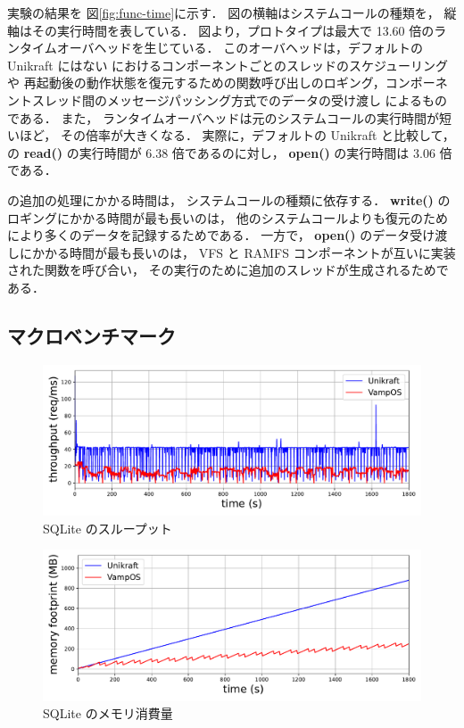 実験の結果を
図\ref{fig:func-time}に示す．
図の横軸はシステムコールの種類を，
縦軸はその実行時間を表している．
図より，プロトタイプは最大で 13.60 倍のランタイムオーバヘッドを生じている．
このオーバヘッドは，デフォルトの Unikraft にはない \sysname におけるコンポーネントごとのスレッドのスケジューリングや
再起動後の動作状態を復元するための関数呼び出しのロギング，コンポーネントスレッド間のメッセージパッシング方式でのデータの受け渡し
によるものである．
また，
ランタイムオーバヘッドは元のシステムコールの実行時間が短いほど，
その倍率が大きくなる．
実際に，デフォルトの Unikraft と比較して，
\sysname の \textbf{read()} の実行時間が 6.38 倍であるのに対し，
\textbf{open()} の実行時間は 3.06 倍である．

\sysname の追加の処理にかかる時間は，
システムコールの種類に依存する．
\textbf{write()} のロギングにかかる時間が最も長いのは，
他のシステムコールよりも復元のためにより多くのデータを記録するためである．
一方で，
\textbf{open()} のデータ受け渡しにかかる時間が最も長いのは，
VFS と RAMFS コンポーネントが互いに実装された関数を呼び合い，
その実行のために追加のスレッドが生成されるためである．


\subsection{マクロベンチマーク}

\begin{figure}[!t]
    \centering
    \includegraphics[width=\linewidth]{img/SQLite-perf.pdf}
    \caption{SQLite のスループット}
    \label{fig:sqlite-perf}
\end{figure}

\begin{figure}[!t]
    \centering
    \includegraphics[width=\linewidth]{img/SQLite-mem.pdf}
    \caption{SQLite のメモリ消費量}
    \label{fig:sqlite-mem}
\end{figure}

